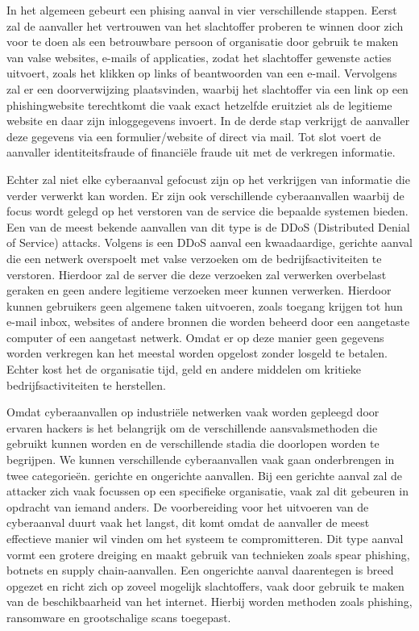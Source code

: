 \vspace{5mm}
In het algemeen gebeurt een phising aanval in vier verschillende stappen. Eerst zal de aanvaller het vertrouwen van het slachtoffer proberen te winnen door zich voor te doen als een betrouwbare persoon of organisatie door gebruik te maken van valse websites, e-mails of applicaties, zodat het slachtoffer gewenste acties uitvoert, zoals het klikken op links of beantwoorden van een e-mail. Vervolgens zal er een doorverwijzing plaatsvinden, waarbij het slachtoffer via een link op een phishingwebsite terechtkomt die vaak exact hetzelfde eruitziet als de legitieme website en daar zijn inloggegevens invoert. In de derde stap verkrijgt de aanvaller deze gegevens via een formulier/website of direct via mail. Tot slot voert de aanvaller identiteitsfraude of financiële fraude uit met de verkregen informatie. \autocite{varshney2024}

\vspace{5mm}
Echter zal niet elke cyberaanval gefocust zijn op het verkrijgen van informatie die verder verwerkt kan worden. Er zijn ook verschillende cyberaanvallen waarbij de focus wordt gelegd op het verstoren van de service die bepaalde systemen bieden. Een van de meest bekende aanvallen van dit type is de DDoS (Distributed Denial of Service) attacks. Volgens \textcite{Baker2024} is een DDoS aanval een kwaadaardige, gerichte aanval die een netwerk overspoelt met valse verzoeken om de bedrijfsactiviteiten te verstoren. Hierdoor zal de server die deze verzoeken zal verwerken overbelast geraken en geen andere legitieme verzoeken meer kunnen verwerken. Hierdoor kunnen gebruikers geen algemene taken uitvoeren, zoals toegang krijgen tot hun e-mail inbox, websites of andere bronnen die worden beheerd door een aangetaste computer of een aangetast netwerk. Omdat er op deze manier geen gegevens worden verkregen kan het meestal worden opgelost zonder losgeld te betalen. Echter kost het de organisatie tijd, geld en andere middelen om kritieke bedrijfsactiviteiten te herstellen.

\vspace{5mm}
Omdat cyberaanvallen op industriële netwerken vaak worden gepleegd door ervaren hackers is het belangrijk om de verschillende aansvalsmethoden die gebruikt kunnen worden en de verschillende stadia die doorlopen worden te begrijpen. We kunnen verschillende cyberaanvallen vaak gaan onderbrengen in twee categorieën. gerichte en ongerichte aanvallen. Bij een gerichte aanval zal de attacker zich vaak focussen op een specifieke organisatie, vaak zal dit gebeuren in opdracht van iemand anders. De voorbereiding voor het uitvoeren van de cyberaanval duurt vaak het langst, dit komt omdat de aanvaller de meest effectieve manier wil vinden om het systeem te compromitteren. Dit type aanval vormt een grotere dreiging en maakt gebruik van technieken zoals spear phishing, botnets en supply chain-aanvallen. Een ongerichte aanval daarentegen is breed opgezet en richt zich op zoveel mogelijk slachtoffers, vaak door gebruik te maken van de beschikbaarheid van het internet. Hierbij worden methoden zoals phishing, ransomware en grootschalige scans toegepast. \autocite{biju2019}



